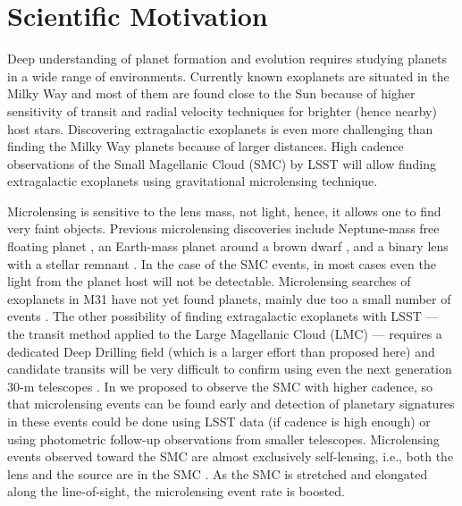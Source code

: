 \documentclass[12pt,letterpaper]{article}
\begin{document}
\clearpage

\section{Scientific Motivation}

Deep understanding of planet formation and evolution requires 
studying planets in a wide range of environments.  Currently known exoplanets 
are situated in the Milky Way and most of them are found close to the Sun 
because of higher sensitivity of transit and radial velocity techniques for 
brighter (hence nearby) host stars.  Discovering extragalactic exoplanets 
is even more challenging than finding the Milky Way planets because of 
larger distances.  High cadence observations of 
the Small Magellanic Cloud (SMC) by LSST will allow 
finding extragalactic exoplanets using gravitational microlensing 
technique.  

Microlensing is sensitive to the lens mass, not light, hence, 
it allows one to find very faint objects.  Previous microlensing 
discoveries include Neptune-mass free floating planet \citep{mroz18a}, 
an Earth-mass planet around a brown dwarf \citep{shvartzvald17b}, and 
a binary lens with a stellar remnant \citep{shvartzvald15}. 
In the case of the SMC events, in most cases even the light from the planet host will not be detectable.  
Microlensing searches of exoplanets in M31 
have not yet found planets, mainly due too a small number of events 
\citep{ingrosso09,calchinovati14,lee15}.  The other possibility of 
finding extragalactic exoplanets with LSST --- the transit method applied 
to the Large Magellanic Cloud (LMC) --- requires a dedicated Deep Drilling field 
(which is a larger effort than proposed here) and candidate transits will be 
very difficult to confirm using even the next generation 30-m telescopes 
\citep{lund15,jacklin15}.  In \citet{mroz18b} we proposed to observe the SMC with 
higher cadence, so that microlensing events can be found early and 
detection of planetary signatures in these events could be done using 
LSST data (if cadence is high enough) or using photometric follow-up 
observations from smaller telescopes.  Microlensing events observed toward
the SMC are almost exclusively self-lensing, i.e., both the lens and 
the source are in the SMC \citep{sahu98,wyrzykowski11b}.  As the SMC 
is stretched and elongated 
along the line-of-sight, the microlensing event rate is boosted.
\end{document}

